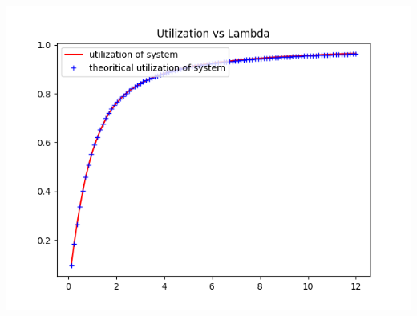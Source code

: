 \documentclass[11pt]{article}
\begin{document}
 \includegraphics{Utilization_L10_K4_M4_U3}
 
\end{document}
